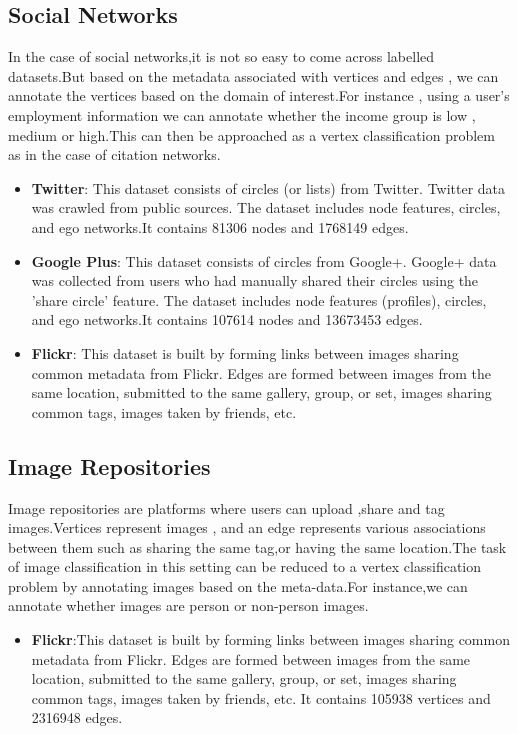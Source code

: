 \documentclass{article}
\begin{document}
\subsection*{Social Networks}
In the case of social networks,it is not so easy to come across labelled datasets.But based on the metadata associated with vertices and edges , we can annotate the vertices based on the domain of interest.For instance , using a user's employment information we can annotate whether the income group is low , medium or high.This can then be approached as a vertex classification problem as in the case of citation networks. 
\begin{itemize}
\item \textbf{Twitter}: This dataset consists of circles (or lists) from Twitter. Twitter data was crawled from public sources. The dataset includes node features, circles, and ego networks.It contains 81306 nodes and 1768149 edges.
\item \textbf{Google Plus}: This dataset consists of circles from Google+. Google+ data was collected from users who had manually shared their circles using the 'share circle' feature. The dataset includes node features (profiles), circles, and ego networks.It contains 107614 nodes and 13673453 edges.
\item \textbf{Flickr}: This dataset is built by forming links between images sharing common metadata from Flickr. Edges are formed between images from the same location, submitted to the same gallery, group, or set, images sharing common tags, images taken by friends, etc.
\end{itemize}
\subsection*{Image Repositories}
Image repositories are platforms where users can upload ,share and tag images.Vertices represent images , and an edge represents various associations between them such as sharing the same tag,or having the same location.The task of image classification in this setting can be reduced to a vertex classification problem by annotating images based on the meta-data.For instance,we can annotate whether images are person or non-person images. 
\begin{itemize}
\item \textbf{Flickr}:This dataset is built by forming links between images sharing common metadata from Flickr. Edges are formed between images from the same location, submitted to the same gallery, group, or set, images sharing common tags, images taken by friends, etc.
It contains 105938 vertices and 2316948 edges.
\end{itemize}  
\end{document}
